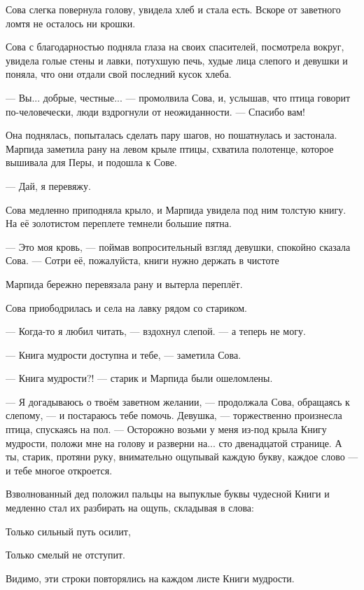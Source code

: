 \documentclass[oneside,final,14pt]{extreport}
\begin{document}
	Сова слегка повернула голову, увидела хлеб и стала есть. Вскоре от заветного ломтя не осталось ни крошки.
	
	Сова с благодарностью подняла глаза на своих спасителей, посмотрела вокруг, увидела голые стены и лавки, потухшую печь, худые лица слепого и девушки и поняла, что они отдали свой последний кусок хлеба.
	
	— Вы... добрые, честные... — промолвила Сова, и, услышав, что птица говорит по-человечески, люди вздрогнули от неожиданности. — Спасибо вам!
	
	Она поднялась, попыталась сделать пару шагов, но пошатнулась и застонала. Марпида заметила рану на левом крыле птицы, схватила полотенце, которое вышивала для Перы, и подошла к Сове.
	
	— Дай, я перевяжу.
	
	Сова медленно приподняла крыло, и Марпида увидела под ним толстую книгу. На её золотистом переплете темнели большие пятна.
	
	— Это моя кровь, — поймав вопросительный взгляд девушки, спокойно сказала Сова. — Сотри её, пожалуйста, книги нужно держать в чистоте
	
	Марпида бережно перевязала рану и вытерла переплёт.
	
	Сова приободрилась и села на лавку рядом со стариком.
	
	— Когда-то я любил читать, — вздохнул слепой. — а теперь не могу.
	
	— Книга мудрости доступна и тебе, — заметила Сова.
	
	— Книга мудрости?! — старик и Марпида были ошеломлены.
	
	— Я догадываюсь о твоём заветном желании, — продолжала Сова, обращаясь к слепому, — и постараюсь тебе помочь. Девушка, — торжественно произнесла птица, спускаясь на пол. — Осторожно возьми у меня из-под крыла Книгу мудрости, положи мне на голову и разверни на... сто двенадцатой странице. А ты, старик, протяни руку, внимательно ощупывай каждую букву, каждое слово — и тебе многое откроется.
	
	Взволнованный дед положил пальцы на выпуклые буквы чудесной Книги и медленно стал их разбирать на ощупь, складывая в слова:
	
	
	
	
\qquad \qquad \qquad \qquad 	Только сильный путь осилит,
	
\qquad \qquad \qquad \qquad 	Только смелый не отступит.
	
	
	
	
	Видимо, эти строки повторялись на каждом листе Книги мудрости.
	
\end{document}
